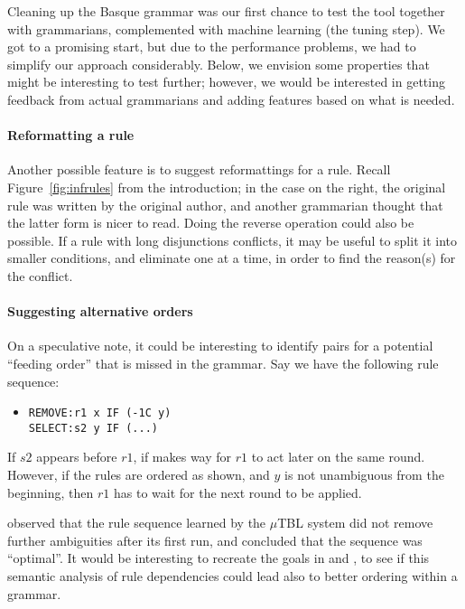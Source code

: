 {{Cleaning up the Basque grammar was our first chance to test the tool
together with grammarians, complemented with machine learning (the
tuning step). We got to a promising start, but due to the performance
problems, we had to simplify our approach considerably. Below, we
envision some properties that might be interesting to test further;
however, we would be interested in getting feedback from actual
grammarians and adding features based on what is needed.

\paragraph{Reformatting a rule}

Another possible feature is to suggest reformattings for a rule. Recall
Figure~\ref{fig:infrules} from the introduction; in the case on the right, the
original rule was written by the original author, and another
grammarian thought that the latter form is nicer to read. Doing the
reverse operation could also be possible. If a rule with long
disjunctions conflicts, it may be useful to split it into smaller
conditions, and eliminate one at a time, in order to find the
reason(s) for the conflict.


\paragraph{Suggesting alternative orders}
On a speculative note, it could be interesting to identify pairs for a
potential ``feeding order'' that is missed in the grammar. Say we have
the following rule sequence:

\begin{itemize}
\item[]
\begin{verbatim}
REMOVE:r1 x IF (-1C y)
SELECT:s2 y IF (...)
\end{verbatim}
\end{itemize}

If $s2$ appears before $r1$, if makes way for $r1$ to act later on the
same round.  However, if the rules are ordered as shown, and $y$ is
not unambiguous from the beginning, then $r1$ has to wait for the next
round to be applied.

\citet{lager01transformation} observed that the rule sequence
learned by the $\mu$TBL system did not remove further ambiguities
after its first run, and concluded that the sequence was ``optimal''.
It would be interesting to recreate the goals in
\citet{lager01transformation} and \citet{bick2013tuning}, to see if this
semantic analysis of rule dependencies could lead also to better
ordering within a grammar.

}}
